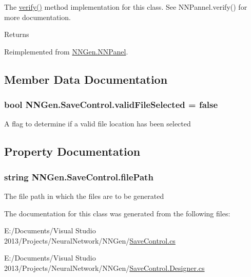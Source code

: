 The \hyperlink{class_n_n_gen_1_1_save_control_a9802bdb470edb0fbc0fe3d7b04863f6c}{verify()} method implementation for this class. See N\+N\+Pannel.\+verify() for more documentation. 

\begin{DoxyReturn}{Returns}

\end{DoxyReturn}


Reimplemented from \hyperlink{class_n_n_gen_1_1_n_n_panel_a36e3bcf90c9e561e8502eac6f884582a}{N\+N\+Gen.\+N\+N\+Panel}.



\subsection{Member Data Documentation}
\hypertarget{class_n_n_gen_1_1_save_control_a5fd0da9af116b678a881f5ceb5ec0c40}{}
\subsubsection[{valid\+File\+Selected}]{\setlength{\rightskip}{0pt plus 5cm}bool N\+N\+Gen.\+Save\+Control.\+valid\+File\+Selected = false}\label{class_n_n_gen_1_1_save_control_a5fd0da9af116b678a881f5ceb5ec0c40}


A flag to determine if a valid file location has been selected 



\subsection{Property Documentation}
\hypertarget{class_n_n_gen_1_1_save_control_ac72242b01e15f912ee7c3f58592afea9}{}
\subsubsection[{file\+Path}]{\setlength{\rightskip}{0pt plus 5cm}string N\+N\+Gen.\+Save\+Control.\+file\+Path\hspace{0.3cm}{\ttfamily [get]}}\label{class_n_n_gen_1_1_save_control_ac72242b01e15f912ee7c3f58592afea9}


The file path in which the files are to be generated 



The documentation for this class was generated from the following files\+:\begin{DoxyCompactItemize}
\item 
E\+:/\+Documents/\+Visual Studio 2013/\+Projects/\+Neural\+Network/\+N\+N\+Gen/\hyperlink{_save_control_8cs}{Save\+Control.\+cs}\item 
E\+:/\+Documents/\+Visual Studio 2013/\+Projects/\+Neural\+Network/\+N\+N\+Gen/\hyperlink{_save_control_8_designer_8cs}{Save\+Control.\+Designer.\+cs}\end{DoxyCompactItemize}
